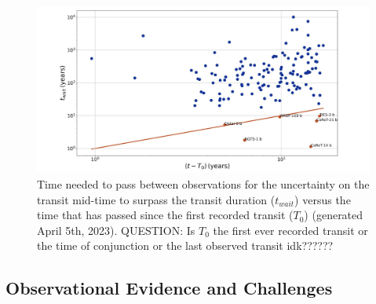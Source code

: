 \documentclass[oneside,12pt]{amsart}
\numberwithin{page}{section}
\begin{document}
\begin{figure}[htbp]
    \centering 
    \includegraphics[width=\linewidth]{figs/jackson_fig3.png}
    \caption{Time needed to pass between observations for the uncertainty on the transit mid-time to surpass the transit duration ($t_{wait}$) versus the time that has passed since the first recorded transit ($T_0$) (generated April 5th, 2023). QUESTION: Is $T_0$ the first ever recorded transit or the time of conjunction or the last observed transit idk??????}
    \label{fig:jackson_fig3}
\end{figure}







\subsection{Observational Evidence and Challenges}
\end{document}
